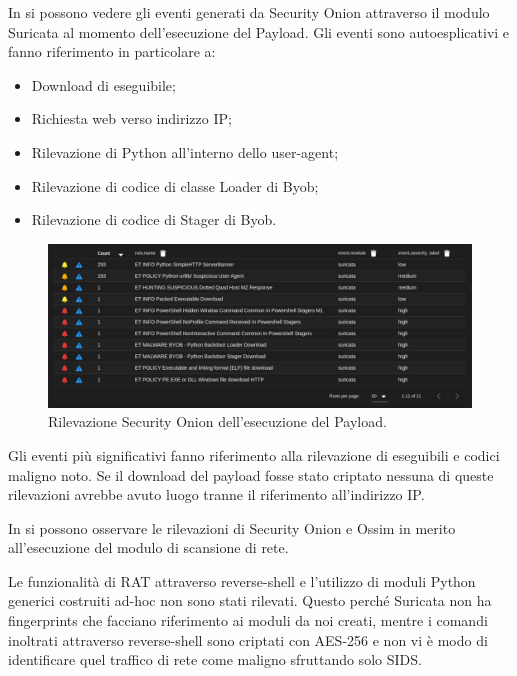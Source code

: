 In  si possono vedere gli eventi generati da Security Onion attraverso il modulo Suricata al momento dell'esecuzione del Payload. Gli eventi sono autoesplicativi e fanno riferimento in particolare a:
\begin{itemize}
    \item Download di eseguibile;
    \item Richiesta web verso indirizzo IP;
    \item Rilevazione di Python all'interno dello user-agent;
    \item Rilevazione di codice di classe Loader di Byob;
    \item Rilevazione di codice di Stager di Byob.
\end{itemize}

\begin{figure}[hbtp]
    \centering
    \includegraphics[width=\textwidth]{res/fig/byob-result-1.png}
    \caption{Rilevazione Security Onion dell'esecuzione del Payload.}
    \label{fig:byob-result-1}
\end{figure}

Gli eventi più significativi fanno riferimento alla rilevazione di eseguibili e codici maligno noto. Se il download del payload fosse stato criptato nessuna di queste rilevazioni   avrebbe avuto luogo tranne il riferimento all'indirizzo IP.

In  si possono osservare le rilevazioni di Security Onion e Ossim in merito all'esecuzione del modulo di scansione di rete.

Le funzionalità di RAT attraverso reverse-shell e l'utilizzo di moduli Python generici costruiti ad-hoc non sono stati rilevati.
Questo perché  Suricata non ha fingerprints che facciano riferimento ai moduli da noi creati, mentre i comandi inoltrati attraverso reverse-shell sono criptati con AES-256 e non vi è modo di identificare quel traffico di rete come maligno sfruttando solo SIDS.


